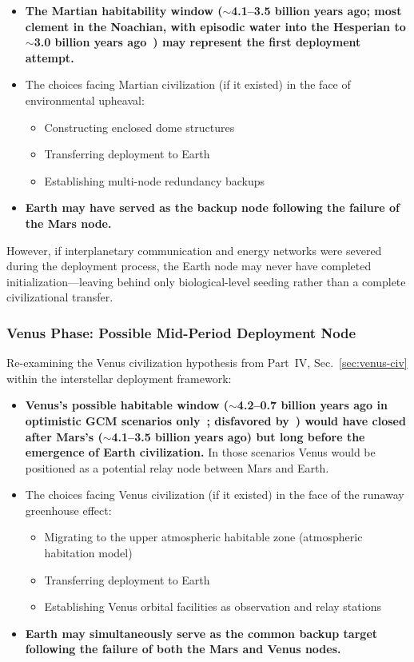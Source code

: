 \documentclass[aps,prd,twocolumn,superscriptaddress,nofootinbib]{revtex4-2}
\begin{document}
\begin{itemize}
  \item \textbf{The Martian habitability window (${\sim}$4.1--3.5 billion years ago; most clement in the Noachian, with episodic water into the Hesperian to ${\sim}$3.0 billion years ago~\cite{Carr2010}) may represent the first deployment attempt.}
  \item The choices facing Martian civilization (if it existed) in the face of environmental upheaval:
  \begin{itemize}
    \item Constructing enclosed dome structures
    \item Transferring deployment to Earth
    \item Establishing multi-node redundancy backups
  \end{itemize}
  \item \textbf{Earth may have served as the backup node following the failure of the Mars node.}
\end{itemize}

However, if interplanetary communication and energy networks were severed during the deployment process, the Earth node may never have completed initialization---leaving behind only biological-level seeding rather than a complete civilizational transfer.

\subsubsection{Venus Phase: Possible Mid-Period Deployment Node}\label{sec:venus-phase}

Re-examining the Venus civilization hypothesis from Part~IV, Sec.~\ref{sec:venus-civ} within the interstellar deployment framework:

\begin{itemize}
  \item \textbf{Venus's possible habitable window (${\sim}$4.2--0.7 billion years ago in optimistic GCM scenarios only~\cite{Way2020}; disfavored by~\cite{Constantinou2024,Turbet2021,Warren2023}) would have closed after Mars's (${\sim}$4.1--3.5 billion years ago) but long before the emergence of Earth civilization.} In those scenarios Venus would be positioned as a potential relay node between Mars and Earth.
  \item The choices facing Venus civilization (if it existed) in the face of the runaway greenhouse effect:
  \begin{itemize}
    \item Migrating to the upper atmospheric habitable zone (atmospheric habitation model)
    \item Transferring deployment to Earth
    \item Establishing Venus orbital facilities as observation and relay stations
  \end{itemize}
  \item \textbf{Earth may simultaneously serve as the common backup target following the failure of both the Mars and Venus nodes.}
\end{itemize}
\end{document}
